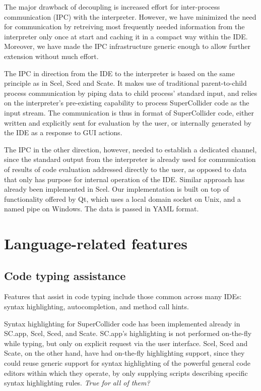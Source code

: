 \documentclass[a4paper,10pt]{article}
\begin{document}
The major drawback of decoupling is increased effort for inter-process communication (IPC) with the
interpreter. However, we have minimized the need for communication by retreiving most frequently
needed information from the interpreter only once at start and caching it in a compact way within
the IDE. Moreover, we have made the IPC infrastructure generic enough to allow further extension
without much effort.

The IPC in direction from the IDE to the interpreter is based on the same principle as in Scel,
Sced and Scate. It makes use of traditional parent-to-child process communication by piping data to
child process' standard input, and relies on the interpreter's pre-existing capability to
process SuperCollider code as the input stream. The communication is thus in format of SuperCollider
code, either written and explicitly sent for evaluation by the user, or internally generated by
the IDE as a response to GUI actions.

The IPC in the other direction, however, needed to establish a dedicated channel, since the standard
output from the interpreter is already used for communication of results of code evaluation
addressed directly to the user, as opposed to data that only has purpose for internal operation of
the IDE. Similar approach has already been implemented in Scel. Our implementation is built on top
of functionality offered by Qt, which uses a local domain socket on Unix, and a named pipe on
Windows. The data is passed in YAML format.


\section{Language-related features}

\subsection{Code typing assistance}

Features that assist in code typing include those common across many IDEs: syntax highlighting,
autocompletion, and method call hints.

Syntax highlighting for SuperCollider code has been implemented already in SC.app, Scel, Sced, and
Scate. SC.app's highlighting is not performed on-the-fly while typing, but only on explicit request
via the user interface. Scel, Sced and Scate, on the other hand, have had on-the-fly highlighting
support, since they could reuse generic support for syntax highlighting of the powerful general code
editors within which they operate, by only supplying scripts describing specific syntax highlighting
rules. \emph{True for all of them?}
\end{document}

